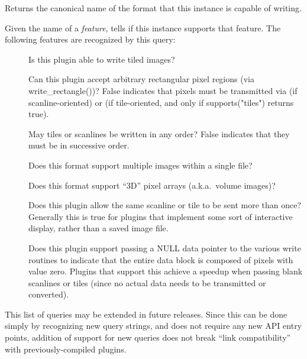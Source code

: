 \apiend

Returns the canonical name of the format that this \ImageOutput
instance is capable of writing.
\apiend

\label{sec:supportsfeaturelist}
Given the name of a \emph{feature}, tells if this \ImageOutput 
instance supports that feature.  The following features are recognized
by this query:
\begin{description}
\item[\spc] \spc 
\item[\rm {}] Is this plugin able to write tiled images?
\item[\rm {}] Can this plugin accept arbitrary rectangular
  pixel regions (via {\kw write_rectangle()})?  False indicates that
  pixels must be transmitted via \writescanline (if
  scanline-oriented) or \writetile (if tile-oriented, and only if
  {\kw supports("tiles")} returns true).
\item[\rm {}] May tiles or scanlines be written in any
  order?  False indicates that they must be in successive order.
\item[\rm {}] Does this format support multiple images
  within a single file?
\item[\rm {}] Does this format support ``3D'' pixel arrays
  (a.k.a.\ volume images)?
\item[\rm {}] Does this plugin allow the same scanline or
  tile to be sent more than once?  Generally this is true for plugins
  that implement some sort of interactive display, rather than a saved
  image file.
\item[\rm {}] Does this plugin support passing a NULL data
  pointer to the various {\kw write} routines to indicate that the
  entire data block is composed of pixels with value zero.  Plugins
  that support this achieve a speedup when passing blank scanlines or
  tiles (since no actual data needs to be transmitted or converted).
\end{description}

\noindent This list of queries may be extended in future releases.
Since this can be done simply by recognizing new query strings, and does
not require any new API entry points, addition of support for new
queries does not break ``link compatibility'' with previously-compiled
plugins.
\apiend


